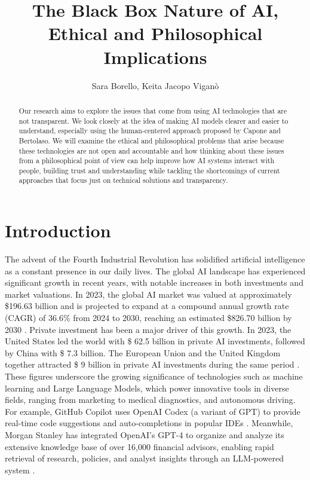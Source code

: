 \documentclass[times, twoside, watermark]{zHenriquesLab-StyleBioRxiv}
\begin{document}
\title{The Black Box Nature of AI, Ethical and Philosophical Implications}

\author[1,\Letter]{Sara Borello, Keita Jacopo Viganò}


\maketitle

\begin{abstract}
Our research aims to explore the issues that come from using AI technologies that are not transparent. We look closely at the idea of making AI models clearer and easier to understand, especially using the human-centered approach proposed by Capone and Bertolaso. We will examine the ethical and philosophical problems that arise because these technologies are not open and accountable and how thinking about these issues from a philosophical point of view can help improve how AI systems interact with people, building trust and understanding while tackling the shortcomings of current approaches that focus just on technical solutions and transparency.
\end {abstract}

\section*{Introduction}

The advent of the Fourth Industrial Revolution has solidified artificial intelligence as a constant presence in our daily lives. The global AI landscape has experienced significant growth in recent years, with notable increases in both investments and market valuations. In 2023, the global AI market was valued at approximately \$196.63 billion and is projected to expand at a compound annual growth rate (CAGR) of 36.6\% from 2024 to 2030, reaching an estimated \$826.70 billion by 2030 \cite{ai_market}. Private investment has been a major driver of this growth. In 2023, the United States led the world with \$ 62.5 billion in private AI investments, followed by China with \$ 7.3 billion. The European Union and the United Kingdom together attracted \$ 9 billion in private AI investments during the same period \cite{ai_regulations}. These figures underscore the growing significance of technologies such as machine learning and Large Language Models, which power innovative tools in diverse fields, ranging from marketing to medical diagnostics, and autonomous driving. For example, GitHub Copilot uses OpenAI Codex (a variant of GPT) to provide real-time code suggestions and auto-completions in popular IDEs \cite{github_copilot}. Meanwhile, Morgan Stanley has integrated OpenAI’s GPT-4 to organize and analyze its extensive knowledge base of over 16,000 financial advisors, enabling rapid retrieval of research, policies, and analyst insights through an LLM-powered system \cite{openai_morgan_stanley}.
\end{document}
